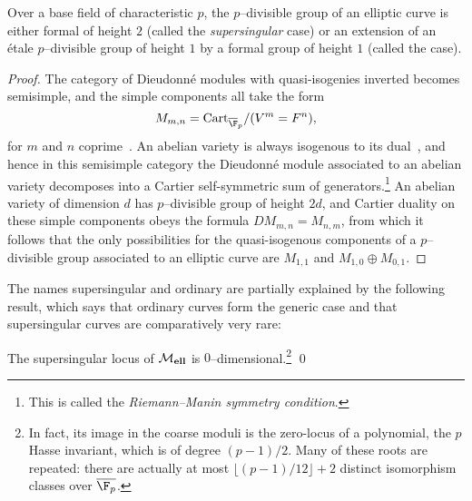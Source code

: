 \begin{lemma}
Over a base field of characteristic \(p\), the \(p\)--divisible group of an elliptic curve is either formal of height \(2\) (called the \textit{supersingular} case) or an extension of an \'etale \(p\)--divisible group of height \(1\) by a formal group of height \(1\) (called the  case).
\end{lemma}
\begin{proof}
The category of Dieudonn\'e modules with quasi-isogenies inverted becomes semisimple, and the simple components all take the form \[M_{m, n} = \Cart_{\overline{\F}_p} / (V^m = F^n),\] for \(m\) and \(n\) coprime~\cite{Manin}.  An abelian variety is always isogenous to its dual~\cite[Section 7]{Milne}, and hence in this semisimple category the Dieudonn\'e module associated to an abelian variety decomposes into a Cartier self-symmetric sum of generators.\footnote{This is called the \textit{Riemann--Manin symmetry condition}.}  An abelian variety of dimension \(d\) has \(p\)--divisible group of height \(2d\), and Cartier duality on these simple components obeys the formula \(DM_{m,n} = M_{n,m}\), from which it follows that the only possibilities for the quasi-isogenous components of a \(p\)--divisible group associated to an elliptic curve are \(M_{1,1}\) and \(M_{1,0} \oplus M_{0,1}\).
\end{proof}

The names supersingular and ordinary are partially explained by the following result, which says that ordinary curves form the generic case and that supersingular curves are comparatively very rare:

\begin{lemma}
The supersingular locus of \(\mathcal{M}_{\mathbf{ell}}\) is \(0\)--dimensional.\footnote{In fact, its image in the coarse moduli is the zero-locus of a polynomial, the \(p\){\th} Hasse invariant, which is of degree \((p-1)/2\).  Many of these roots are repeated: there are actually at most \(\lfloor (p-1)/12 \rfloor + 2\) distinct isomorphism classes over \(\overline{\F_p}\).} \qed
\end{lemma}

